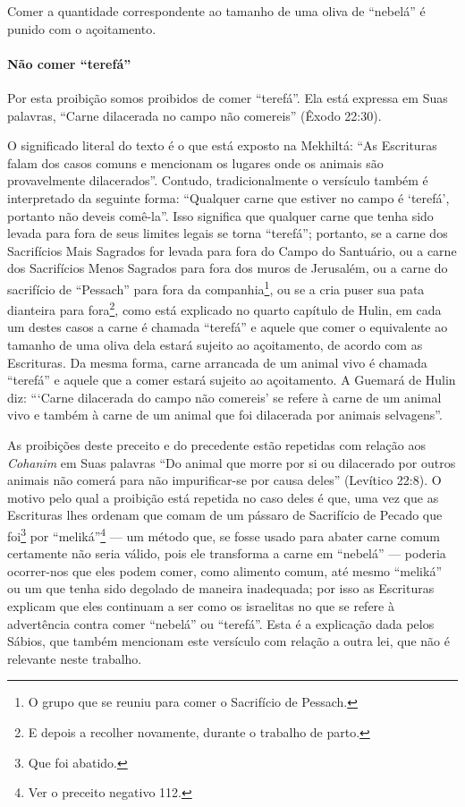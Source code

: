 Comer a quantidade correspondente ao tamanho de uma oliva de ``nebelá''
é punido com o açoitamento.

\paragraph{Não comer ``terefá''}

Por esta proibição somos proibidos de comer ``terefá''. Ela está
expressa em Suas palavras, ``Carne dilacerada no campo não comereis''
(Êxodo 22:30).

O significado literal do texto é o que está exposto na Mekhiltá: ``As
Escrituras falam dos casos comuns e mencionam os lugares onde os
animais são provavelmente dilacerados''. Contudo, tradicionalmente o
versículo também é interpretado da seguinte forma: ``Qualquer carne que
estiver no campo é `terefá', portanto não deveis comê-la''. Isso
significa que qualquer carne que tenha sido levada para fora de seus
limites legais se torna ``terefá''; portanto, se a carne dos Sacrifícios
Mais Sagrados for levada para fora do Campo do Santuário, ou a carne
dos Sacrifícios Menos Sagrados para fora dos muros de Jerusalém, ou a
carne do sacrifício de ``Pessach'' para fora da companhia\footnote{O grupo que se reuniu para comer o Sacrifício de Pessach.}, ou se a cria puser sua pata dianteira para
fora\footnote{E depois a recolher novamente, durante o trabalho de parto.}, como está explicado no quarto capítulo de
Hulin, em cada um destes casos a carne é chamada ``terefá'' e aquele que
comer o equivalente ao tamanho de uma oliva dela estará sujeito ao
açoitamento, de acordo com as Escrituras. Da mesma forma, carne
arrancada de um animal vivo é chamada ``terefá'' e aquele que a comer
estará sujeito ao açoitamento. A Guemará de Hulin diz: ```Carne
dilacerada do campo não comereis' se refere à carne de um animal vivo e
também à carne de um animal que foi dilacerada por animais selvagens''.

As proibições deste preceito e do precedente estão repetidas com relação
aos \textit{Cohanim} em Suas palavras ``Do animal que morre por si ou
dilacerado por outros animais não comerá para não impurificar-se por
causa deles'' (Levítico 22:8). O motivo pelo qual a proibição está
repetida no caso deles é que, uma vez que as Escrituras lhes ordenam que
comam de um pássaro de Sacrifício de Pecado que
foi\footnote{Que foi abatido.} por ``meliká''\footnote{Ver o preceito negativo 112.} --- um
método que, se fosse usado para abater carne comum certamente não seria
válido, pois ele transforma a carne em ``nebelá'' --- poderia
ocorrer-nos que eles podem comer, como alimento comum, até mesmo
``meliká'' ou um que tenha sido degolado de maneira inadequada; por
isso as Escrituras explicam que eles continuam a ser como os israelitas
no que se refere à advertência contra comer ``nebelá'' ou ``terefá''.
Esta é a explicação dada pelos Sábios, que também mencionam este
versículo com relação a outra lei, que não é relevante neste trabalho.

